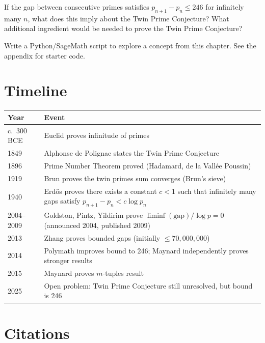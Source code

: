 \begin{exercise}
If the gap between consecutive primes satisfies $p_{n+1} - p_n \leq 246$ for infinitely many $n$, what does this imply about the Twin Prime Conjecture? What additional ingredient would be needed to prove the Twin Prime Conjecture?
\end{exercise}


\begin{exercise}[Computational]
Write a Python/SageMath script to explore a concept from this chapter. See the appendix for starter code.
\end{exercise}

\section{Timeline}

\begin{tabularx}{\linewidth}{lX}
\toprule
\textbf{Year} & \textbf{Event} \\ \midrule
c.\ 300 BCE & Euclid proves infinitude of primes \\ 
1849 & Alphonse de Polignac states the Twin Prime Conjecture \\ 
1896 & Prime Number Theorem proved (Hadamard, de la Vall\'ee Poussin) \\ 
1919 & Brun proves the twin primes sum converges (Brun's sieve) \cite{brun1919} \\ 
1940 & Erd\H{o}s proves there exists a constant $c < 1$ such that infinitely many gaps satisfy $p_{n+1} - p_n < c \log p_n$ \cite{erdos1940} \\ 
2004--2009 & Goldston, Pintz, Yildirim prove $\liminf (\text{gap})/\log p = 0$ (announced 2004, published 2009) \cite{gpy2009} \\ 
2013 & Zhang proves bounded gaps (initially $\leq 70,000,000$) \cite{zhang2014} \\ 
2014 & Polymath improves bound to 246; Maynard independently proves stronger results \cite{polymath2014,maynard2015} \\ 
2015 & Maynard proves $m$-tuples result \cite{maynard2015} \\ 
2025 & Open problem: Twin Prime Conjecture still unresolved, but bound is 246 \\ \bottomrule
\end{tabularx}

\section{Citations}

